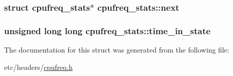 \subsubsection[{\texorpdfstring{next}{next}}]{\setlength{\rightskip}{0pt plus 5cm}struct {\bf cpufreq\+\_\+stats}$\ast$ cpufreq\+\_\+stats\+::next}\hypertarget{structcpufreq__stats_ab414c3188af3d1b94333137a0790b945}{}\label{structcpufreq__stats_ab414c3188af3d1b94333137a0790b945}
\subsubsection[{\texorpdfstring{time\+\_\+in\+\_\+state}{time_in_state}}]{\setlength{\rightskip}{0pt plus 5cm}unsigned long long cpufreq\+\_\+stats\+::time\+\_\+in\+\_\+state}\hypertarget{structcpufreq__stats_a827f8ecb018a53dbb53c883d17a9f944}{}\label{structcpufreq__stats_a827f8ecb018a53dbb53c883d17a9f944}


The documentation for this struct was generated from the following file\+:\begin{DoxyCompactItemize}
\item 
etc/headers/\hyperlink{cpufreq_8h}{cpufreq.\+h}\end{DoxyCompactItemize}
